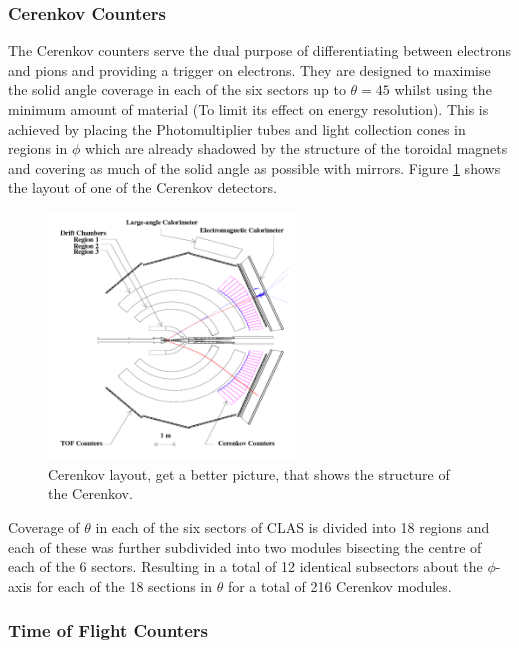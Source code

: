 \subsubsection{Cerenkov Counters}

\cite{adams2001clas}

The Cerenkov counters serve the dual purpose of differentiating between electrons and pions and providing a trigger on electrons. They are designed to maximise the solid angle coverage in each of the six sectors up to $\theta = 45$ whilst using the minimum amount of material (To limit its effect on energy resolution). This is achieved by placing the Photomultiplier tubes and light collection cones in regions in $\phi$ which are already shadowed by the structure of the toroidal magnets and covering as much of the solid angle as possible with mirrors. Figure \ref{CLAScerenkov} shows the layout of one of the Cerenkov detectors.

\begin{figure}
	\centering
	\includegraphics[width=0.6\textwidth]{ImgChap1/CLAS2}
	\caption{Cerenkov layout, get a better picture, that shows the structure of the Cerenkov.}
	\label{CLAScerenkov}
\end{figure}

Coverage of $\theta$ in each of the six sectors of CLAS is divided into 18 regions and each of these was further subdivided into two modules bisecting the centre of each of the 6 sectors. Resulting in a total of 12 identical subsectors about the $\phi$-axis for each of the 18 sections in $\theta$ for a total of 216 Cerenkov modules. \cite{adams2001clas}

\subsubsection{Time of Flight Counters}

